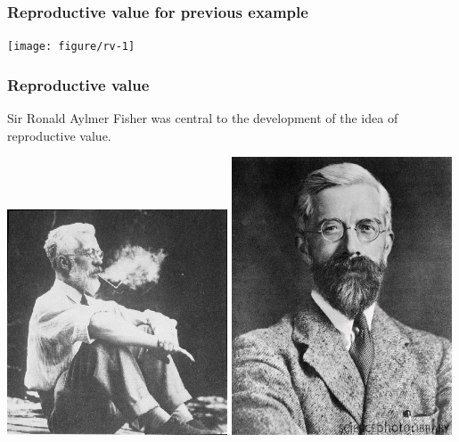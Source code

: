 \documentclass[color=usenames,dvipsnames]{beamer}\usepackage[]{graphicx}\usepackage[]{color}
\begin{document}



\begin{frame}[fragile]
  \frametitle{Reproductive value for previous example}

\centering
\texttt{[image: figure/rv-1]} \\
\end{frame}




\begin{frame}
  \frametitle{Reproductive value}
  Sir Ronald Aylmer Fisher was central to the development of the idea
  of reproductive value.
  \begin{center}
    \includegraphics[width=0.49\textwidth]{figs/fisher1} \hfill
    \includegraphics[width=0.49\textwidth]{figs/fisher2}
  \end{center}
\end{frame}
\end{document}

